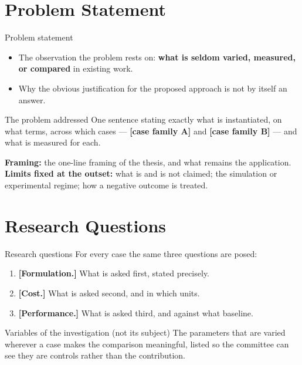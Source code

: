 \documentclass[aspectratio=43, 11pt, xcolor=dvipsnames, compress]{beamer}
\begin{document}
\section{Problem Statement}
\begin{frame}{Problem statement}
  \footnotesize
  \begin{itemize}
    \item The observation the problem rests on: \textbf{what is seldom varied, measured, or compared} in existing work.
    \item Why the obvious justification for the proposed approach is not by itself an answer.
  \end{itemize}
  \begin{alertblock}{The problem addressed}
    One sentence stating exactly what is instantiated, on what terms, across which cases ---
    \textbf{[case family A]} and
    \textbf{[case family B]} ---
    and what is measured for each.
  \end{alertblock}
  \vskip0.1cm
  \textbf{Framing:} the one-line framing of the thesis, and what remains the application.\\
  \textbf{Limits fixed at the outset:} what is and is not claimed; the simulation or experimental regime; how a negative outcome is treated.
\end{frame}

\section{Research Questions}
\begin{frame}{Research questions}
  For every case the same three questions are posed:
  \vskip0.3cm
  \begin{enumerate}
    \item[\textbf{RQ1}] \textbf{[Formulation.]} What is asked first, stated precisely.
    \vskip0.2cm
    \item[\textbf{RQ2}] \textbf{[Cost.]} What is asked second, and in which units.
    \vskip0.2cm
    \item[\textbf{RQ3}] \textbf{[Performance.]} What is asked third, and against what baseline.
  \end{enumerate}
  \vskip0.4cm
  \begin{block}{Variables of the investigation (not its subject)}
    The parameters that are varied wherever a case makes the comparison meaningful, listed so the committee can see they are controls rather than the contribution.
  \end{block}
\end{frame}
\end{document}
